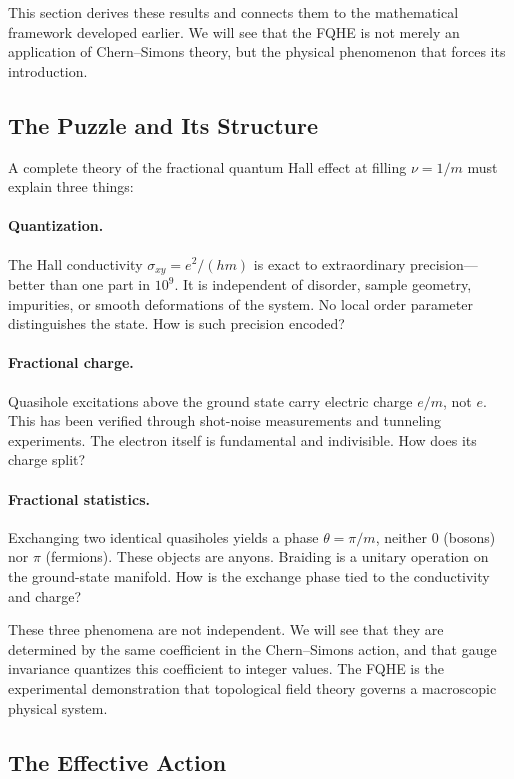 This section derives these results and connects them to the mathematical framework developed earlier. We will see that the FQHE is not merely an application of Chern--Simons theory, but the physical phenomenon that forces its introduction.

\subsection{The Puzzle and Its Structure}
\label{subsec:fqhe-puzzle}

A complete theory of the fractional quantum Hall effect at filling $\nu=1/m$ must explain three things:

\paragraph{Quantization.} The Hall conductivity $\sigma_{xy}=e^2/(hm)$ is exact to extraordinary precision---better than one part in $10^9$. It is independent of disorder, sample geometry, impurities, or smooth deformations of the system. No local order parameter distinguishes the state. How is such precision encoded?

\paragraph{Fractional charge.} Quasihole excitations above the ground state carry electric charge $e/m$, not $e$. This has been verified through shot-noise measurements and tunneling experiments. The electron itself is fundamental and indivisible. How does its charge split?

\paragraph{Fractional statistics.} Exchanging two identical quasiholes yields a phase $\theta=\pi/m$, neither $0$ (bosons) nor $\pi$ (fermions). These objects are anyons. Braiding is a unitary operation on the ground-state manifold. How is the exchange phase tied to the conductivity and charge?

These three phenomena are not independent. We will see that they are determined by the same coefficient in the Chern--Simons action, and that gauge invariance quantizes this coefficient to integer values. The FQHE is the experimental demonstration that topological field theory governs a macroscopic physical system.

\subsection{The Effective Action}
\label{subsec:fqhe-effective-action}

